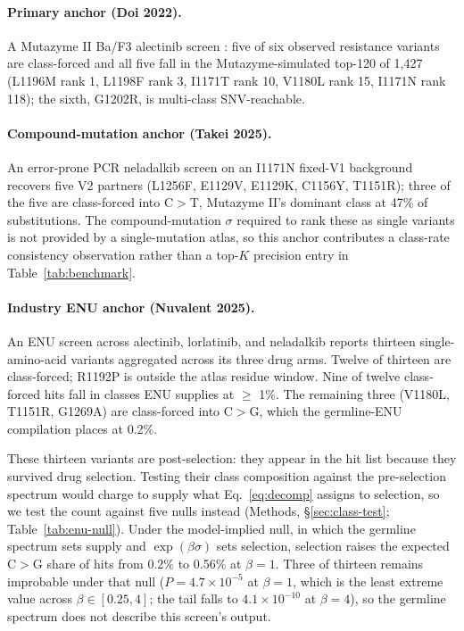 \documentclass[11pt,a4paper]{article}
\begin{document}
\paragraph{Primary anchor (Doi 2022).} A Mutazyme II Ba/F3 alectinib
screen \citep{doi2022}: five of six observed resistance variants are
class-forced and all five fall in the Mutazyme-simulated top-120 of
1,427 (L1196M rank 1, L1198F rank 3, I1171T rank 10, V1180L rank 15,
I1171N rank 118); the sixth, G1202R, is multi-class SNV-reachable.

\paragraph{Compound-mutation anchor (Takei 2025).} An error-prone PCR
neladalkib screen on an I1171N fixed-V1 background \citep{takei2025}
recovers five V2 partners (L1256F, E1129V, E1129K, C1156Y, T1151R);
three of the five are class-forced into C$>$T, Mutazyme II's dominant
class at 47\% of substitutions. The compound-mutation $\sigma$ required to
rank these as single variants is not provided by a single-mutation
atlas, so this anchor contributes a class-rate consistency observation
rather than a top-$K$ precision entry in Table~\ref{tab:benchmark}.

\paragraph{Industry ENU anchor (Nuvalent 2025).} An ENU screen across
alectinib, lorlatinib, and neladalkib \citep{tangpeerachaikul2025}
reports thirteen single-amino-acid variants aggregated across its three
drug arms. Twelve of thirteen are class-forced; R1192P is outside the
atlas residue window. Nine of twelve class-forced hits fall in classes
ENU supplies at $\geq$ 1\%. The remaining three (V1180L, T1151R,
G1269A) are class-forced into C$>$G, which the germline-ENU
compilation \citep{arnold2012} places at 0.2\%.

These thirteen variants are post-selection: they appear in the hit list
because they survived drug selection. Testing their class composition
against the pre-selection spectrum would charge to supply what
Eq.~\ref{eq:decomp} assigns to selection, so we test the count against
five nulls instead (Methods, \S\ref{sec:class-test};
Table~\ref{tab:enu-null}). Under the model-implied null, in which the
germline spectrum sets supply and $\exp(\beta\sigma)$ sets selection,
selection raises the expected C$>$G share of hits from 0.2\% to 0.56\%
at $\beta = 1$. Three of thirteen remains improbable under that null
($P = 4.7 \times 10^{-5}$ at $\beta = 1$, which is the least extreme
value across $\beta \in [0.25, 4]$; the tail falls to
$4.1\times 10^{-10}$ at $\beta = 4$), so the germline spectrum does
not describe this screen's output.
\end{document}
